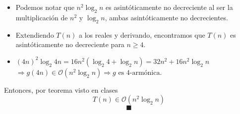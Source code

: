 \documentclass[12pt]{article}
\begin{document}
\begin{itemize}
  \item Podemos notar que $n^2\log_2n$ es asintóticamente no decreciente al ser la multiplicación de $n^2$ y
  $\log_2 n$, ambas asintóticamente no decrecientes.
  \item Extendiendo $T(n)$ a los reales y derivando, encontramos que $T(n)$ es asintóticamente no decreciente
  para $n \geq 4$.
  \item $(4n)^2\log_2 4n = 16n^2 (\log_2 4 + \log_2 n) = 32n^2 + 16n^2\log_2 n$\\
  $\Rightarrow g(4n) \in \mathcal{O}(n^2\log_2 n) \Rightarrow g\text{ es 4-armónica}$.
\end{itemize}

Entonces, por teorema visto en clases
$$T(n) \in \mathcal{O}(n^2\log_2 n)$$
$$\blacksquare$$

\end{document}
